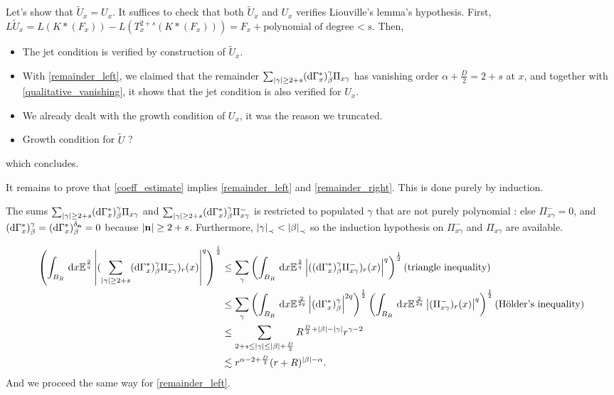 Let's show that $\tilde{U}_x = U_x$. It suffices to check that both $\tilde{U}_x$ and $U_x$ verifies Liouville's lemma's hypothesis.
First, $L\tilde{U}_x = L(K*(F_x)) - L(T_x^{2+s}(K*(F_x)))  = F_x + \text{polynomial of degree < s}$.
Then,
\begin{itemize}
    \item The jet condition is verified by construction of $\tilde{U}_x$.
    \item With \eqref{remainder_left}, we claimed that the remainder $\sum_{\left| \gamma \right| \geq 2+s} (\mathrm{d}\Gamma^*_x)_\beta^\gamma \Pi_{x\gamma}$ has vanishing order $\alpha+\frac{D}{2} = 2+s$ at $x$, and together with \eqref{qualitative_vanishing}, it shows that the jet condition is also verified for $U_x$.
    \item We already dealt with the growth condition of $U_x$, it was the reason we truncated.
    \item Growth condition for $\tilde{U}$ ?
\end{itemize}
which concludes.

It remains to prove that \eqref{coeff_estimate} implies \eqref{remainder_left} and \eqref{remainder_right}.
This is done purely by induction.

The sums $\sum_{\left| \gamma \right|\geq 2+s}(\mathrm{d}\Gamma^*_x)_\beta^\gamma \Pi_{x\gamma}$ and $\sum_{\left| \gamma \right|\geq 2+s}(\mathrm{d}\Gamma^*_x)_\beta^\gamma \Pi_{x\gamma}^-$ is restricted to populated $\gamma$ that are not purely polynomial : else $\Pi_{x\gamma}^- = 0$, and $(\mathrm{d}\Gamma^*_x)^\gamma_\beta = (\mathrm{d}\Gamma^*_x)^{\delta_{\mathbf{n}}}_\beta = 0$ because $\left| \mathbf{n} \right|\geq 2+s$.
Furthermore, $\left| \gamma \right|_\prec < \left| \beta \right|_\prec$ so the induction hypothesis on $\Pi^-_{x\gamma}$ and $\Pi_{x\gamma}$ are available.

\begin{align*}
    \left(\int_{B_R} \,\mathrm{d} x \mathbb{E}^{\frac{2}{q}}\left| (\sum_{\left| \gamma \right|\geq 2+s} (\mathrm{d}\Gamma^*_x)_\beta^\gamma \Pi_{x\gamma}^-)_r(x) \right|^q \right)^\frac{1}{2} &\leq \sum_{\gamma}     \left(\int_{B_R} \,\mathrm{d} x \mathbb{E}^{\frac{2}{q}}\left| ((\mathrm{d}\Gamma^*_x)_\beta^\gamma \Pi_{x\gamma}^-)_r(x) \right|^q \right)^\frac{1}{2} (\text{triangle inequality})\\
    &\leq \sum_{\gamma}  \left(\int_{B_R} \,\mathrm{d} x \mathbb{E}^{\frac{2}{2q}}\left| (\mathrm{d}\Gamma^*_x)_\beta^\gamma \right|^{2q} \right)^\frac{1}{2}    \left(\int_{B_R} \,\mathrm{d} x \mathbb{E}^{\frac{2}{2q}}\left| (\Pi_{x\gamma}^-)_r(x) \right|^q \right)^\frac{1}{2} (\text{Hölder's inequality}) \\
    &\leq \sum_{2+s \leq \left| \gamma \right| \leq \left| \beta \right|+\frac{D}{2}} R^{\frac{D}{2}+\left| \beta \right| - \left| \gamma \right|} r^{\gamma - 2} \\
    &\lesssim r^{\alpha - 2 +\frac{D}{2}}(r+R)^{\left| \beta \right|-\alpha}.
\end{align*}
And we proceed the same way for \eqref{remainder_left}.